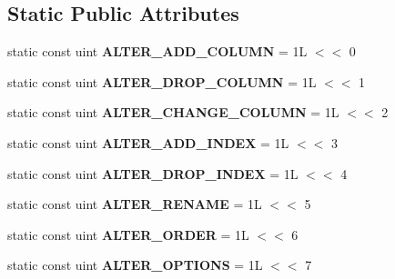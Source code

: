 \subsection*{Static Public Attributes}
\begin{DoxyCompactItemize}
\item 
\mbox{\label{classAlter__info_a1f13a48848a9e22d02c86b2d2f453332}} 
static const uint {\bfseries A\+L\+T\+E\+R\+\_\+\+A\+D\+D\+\_\+\+C\+O\+L\+U\+MN} = 1\+L $<$$<$ 0
\item 
\mbox{\label{classAlter__info_a3ed99874f06de46716d0c5fa1bbab4b5}} 
static const uint {\bfseries A\+L\+T\+E\+R\+\_\+\+D\+R\+O\+P\+\_\+\+C\+O\+L\+U\+MN} = 1\+L $<$$<$ 1
\item 
\mbox{\label{classAlter__info_a50330901ba9f4112e9e46e6a2c1ec047}} 
static const uint {\bfseries A\+L\+T\+E\+R\+\_\+\+C\+H\+A\+N\+G\+E\+\_\+\+C\+O\+L\+U\+MN} = 1\+L $<$$<$ 2
\item 
\mbox{\label{classAlter__info_a2e860f0828abf5d8f46295d43fb37c75}} 
static const uint {\bfseries A\+L\+T\+E\+R\+\_\+\+A\+D\+D\+\_\+\+I\+N\+D\+EX} = 1\+L $<$$<$ 3
\item 
\mbox{\label{classAlter__info_ab844c7f33c57c5b24cd7746de361209c}} 
static const uint {\bfseries A\+L\+T\+E\+R\+\_\+\+D\+R\+O\+P\+\_\+\+I\+N\+D\+EX} = 1\+L $<$$<$ 4
\item 
\mbox{\label{classAlter__info_ae16b1ea1921f0d2349e2ca4f4de6ba04}} 
static const uint {\bfseries A\+L\+T\+E\+R\+\_\+\+R\+E\+N\+A\+ME} = 1\+L $<$$<$ 5
\item 
\mbox{\label{classAlter__info_a49bcdf352fc1cd37d4a08d944c0a6f5b}} 
static const uint {\bfseries A\+L\+T\+E\+R\+\_\+\+O\+R\+D\+ER} = 1\+L $<$$<$ 6
\item 
\mbox{\label{classAlter__info_a39134988997610114efd69d863acd050}} 
static const uint {\bfseries A\+L\+T\+E\+R\+\_\+\+O\+P\+T\+I\+O\+NS} = 1\+L $<$$<$ 7
\item 
\mbox{\label{classAlter__info_a3af45d7723ec4d33be14e2d5a51e0e31}} 

\end{DoxyCompactItemize}
